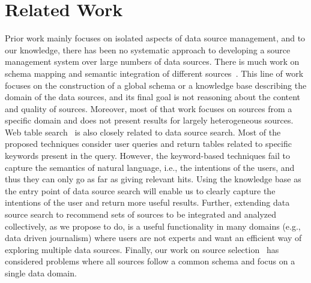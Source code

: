 \documentclass{sig-alternate}
\begin{document}
\section{Related Work}
\label{sec:related}
Prior work mainly focuses on isolated aspects of data source management, and to our knowledge, there has been no systematic approach to developing a source management system over large numbers of data sources. There is much work on schema mapping and semantic integration of different
sources~\cite{cafarella:2009,venetis:11, oktie:13}. This line of work focuses on the construction of a global schema or a knowledge base describing the domain of the data sources, and its final goal is not reasoning about the content and quality of sources. Moreover, most of that work focuses on sources from a specific domain and does not present results for largely heterogeneous sources. Web table search~\cite{cafarella:2009,limaye:2010, dassarma:2012,yakout:2012, fan:2014} is also closely related to data source search. Most of the proposed techniques consider user queries and return tables related to specific keywords present in the query. However, the keyword-based techniques fail to capture the semantics of natural language, i.e., the intentions of the users, and thus they can only go as far as giving relevant hits. Using the knowledge base as the entry point of data source search will enable us to clearly capture the intentions of the user and return more useful results. Further, extending data source search to recommend sets of sources to be integrated and analyzed collectively, as we propose to do, is a useful functionality in many domains (e.g., data driven journalism) where users are not experts and want an efficient way of exploring multiple data sources.  Finally, our work on source selection~\cite{dong:vldb13, rekatsinas:2014} has considered problems where all sources follow a common schema and focus on a single data domain.
\end{document}
